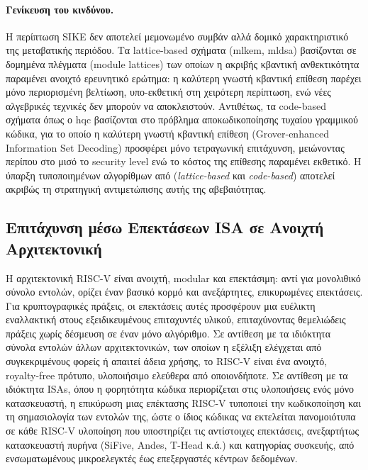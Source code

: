 \paragraph{Γενίκευση του κινδύνου.}
Η περίπτωση SIKE δεν αποτελεί μεμονωμένο συμβάν αλλά δομικό χαρακτηριστικό
της μεταβατικής περιόδου. Τα lattice-based σχήματα (\gls{mlkem}, \gls{mldsa}) βασίζονται
σε δομημένα πλέγματα (module lattices) των οποίων η ακριβής κβαντική ανθεκτικότητα
παραμένει ανοιχτό ερευνητικό ερώτημα: η καλύτερη γνωστή κβαντική επίθεση
παρέχει μόνο περιορισμένη βελτίωση, υπο-εκθετική στη χειρότερη περίπτωση, ενώ
νέες αλγεβρικές τεχνικές δεν μπορούν να
αποκλειστούν. Αντιθέτως, τα code-based σχήματα όπως ο \gls{hqc} βασίζονται στο
πρόβλημα αποκωδικοποίησης τυχαίου γραμμικού κώδικα, για το οποίο η καλύτερη
γνωστή κβαντική επίθεση (Grover-enhanced Information Set Decoding) προσφέρει
μόνο τετραγωνική επιτάχυνση, μειώνοντας περίπου στο μισό το security level ενώ το κόστος της επίθεσης παραμένει εκθετικό. Η ύπαρξη
τυποποιημένων αλγορίθμων από  (\emph{lattice-based} και \emph{code-based}) αποτελεί ακριβώς τη στρατηγική αντιμετώπισης αυτής της
αβεβαιότητας.

\subsection{Επιτάχυνση μέσω Επεκτάσεων ISA σε Ανοιχτή Αρχιτεκτονική}
\label{ssec:software-acceleration}

Η αρχιτεκτονική RISC-V είναι ανοιχτή, modular και επεκτάσιμη: αντί για
μονολιθικό σύνολο εντολών, ορίζει έναν βασικό κορμό και ανεξάρτητες,
επικυρωμένες επεκτάσεις. Για κρυπτογραφικές πράξεις, οι επεκτάσεις αυτές
προσφέρουν μια ευέλικτη εναλλακτική στους εξειδικευμένους επιταχυντές υλικού,
επιταχύνοντας θεμελιώδεις πράξεις χωρίς δέσμευση σε έναν μόνο αλγόριθμο. Σε
αντίθεση με τα ιδιόκτητα σύνολα εντολών άλλων αρχιτεκτονικών,
των οποίων η εξέλιξη ελέγχεται από συγκεκριμένους φορείς ή απαιτεί άδεια χρήσης,
το RISC-V είναι ένα ανοιχτό, royalty-free πρότυπο, υλοποιήσιμο ελεύθερα από
οποιονδήποτε. Σε αντίθεση με τα ιδιόκτητα ISAs, όπου η φορητότητα κώδικα
περιορίζεται στις υλοποιήσεις ενός μόνο κατασκευαστή, η επικύρωση μιας
επέκτασης RISC-V τυποποιεί την κωδικοποίηση και τη σημασιολογία των εντολών
της, ώστε ο ίδιος κώδικας να εκτελείται πανομοιότυπα σε κάθε RISC-V υλοποίηση
που υποστηρίζει τις αντίστοιχες επεκτάσεις, ανεξαρτήτως κατασκευαστή πυρήνα
(SiFive, Andes, T-Head κ.ά.) και κατηγορίας συσκευής, από ενσωματωμένους
μικροελεγκτές έως επεξεργαστές κέντρων δεδομένων.

